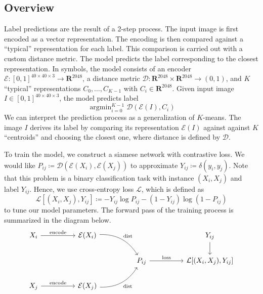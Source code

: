 \documentclass[12pt]{article}
\newcommand{\argmin}{\ensuremath{\mathop{\arg\min}\limits}}
\begin{document}
\subsection{Overview} \label{subsec:overview}

Label predictions are the result of a 2-step process. The input image is first encoded as a vector representation. The encoding is then compared against a ``typical'' representation for each label. This comparison is carried out with a custom distance metric. The model predicts the label corresponding to the closest representation. In symbols, the model consists of an encoder \(\mathcal{E} \colon [0, 1]^{40 \times 40 \times 3} \to \mathbf{R}^{2048}\), a distance metric \(\mathcal{D} \colon \mathbf{R}^{2048} \times \mathbf{R}^{2048} \to (0, 1)\), and \(K\) ``typical'' representations \(C_0, \dotsc, C_{K - 1}\) with \(C_i \in \mathbf{R}^{2048}\). Given input image \(I \in [0, 1]^{40 \times 40 \times 3}\), the model predicts label
\begin{equation}
    \argmin_{i = 0}^{K - 1} \mathcal{D}(\mathcal{E}(I), C_i) \label{eq:prediction}
\end{equation}
We can interpret the prediction process as a generalization of \(K\)-means. The image \(I\) derives its label by comparing its representation \(\mathcal{E}(I)\) against against \(K\) ``centroids'' and choosing the closest one, where distance is defined by \(\mathcal{D}\).

To train the model, we construct a siamese network with contrastive loss. We would like \(P_{ij} \coloneqq \mathcal{D}(\mathcal{E}(X_i), \mathcal{E}(X_j))\) to approximate \(Y_{ij} \coloneqq \delta(y_i, y_j)\). Note that this problem is a binary classification task with instance \((X_i, X_j)\) and label \(Y_{ij}\). Hence, we use cross-entropy loss \(\mathcal{L}\), which is defined as
\begin{equation}
    \mathcal{L}[(X_i, X_j), Y_{ij}] \coloneqq -Y_{ij} \log P_{ij} - (1 - Y_{ij}) \log (1 - P_{ij}) \label{eq:cross_entropy}
\end{equation}
to tune our model parameters. The forward pass of the training process is summarized in the diagram below.
\begin{equation*}
    \begin{tikzcd}
        X_i \arrow[rr, "\text{encode}"] &  & \mathcal{E}(X_i) \arrow[rrd, "\text{dist}", bend left]   &  &                                  &  & Y_{ij} \arrow[d]                  \\
        &  &                                                          &  & P_{ij} \arrow[rr, "\text{loss}"] &  & {\mathcal{L}[(X_i, X_j), Y_{ij}]} \\
        X_j \arrow[rr, "\text{encode}"] &  & \mathcal{E}(X_j) \arrow[rru, "\text{dist}"', bend right] &  &                                  &  &
    \end{tikzcd} \label{eq:training}
\end{equation*}
\end{document}
